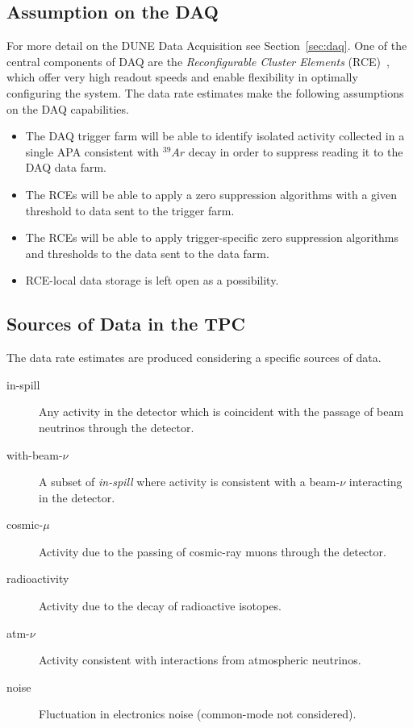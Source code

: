 \subsection{Assumption on the DAQ}
For more detail on the DUNE Data Acquisition see Section~\ref{sec:daq}. One of the central components of DAQ are the \textit{Reconfigurable Cluster Elements} (RCE)~\cite{slac_rce_1},
which offer very high readout speeds and enable flexibility in optimally configuring the system.
The data rate estimates make the following assumptions on the DAQ capabilities.

\begin{itemize}
\item The DAQ trigger farm will be able to identify isolated activity
  collected in a single APA consistent with $^{39}Ar$ decay in order
  to suppress reading it to the DAQ data farm.
\item The RCEs will be able to apply a zero suppression
  algorithms with a given threshold to data sent to the trigger farm.
\item The RCEs will be able to apply trigger-specific zero suppression
  algorithms and thresholds to the data sent to the data farm.
\item RCE-local data storage is left open as a possibility.
\end{itemize}

\subsection{Sources of Data in the TPC}

The data rate estimates are produced considering a specific sources of
data.

\begin{description}
\item[in-spill] Any activity in the detector which is coincident with
  the passage of beam neutrinos through the detector.
\item[with-beam-$\nu$] A subset of \textit{in-spill} where activity is
  consistent with a beam-$\nu$ interacting in the detector.
\item[cosmic-$\mu$] Activity due to the passing of cosmic-ray muons
  through the detector.
\item[radioactivity] Activity due to the decay of radioactive
  isotopes.
\item[atm-$\nu$] Activity consistent with interactions from
  atmospheric neutrinos.
\item[noise] Fluctuation in electronics noise (common-mode not considered).
\end{description}

